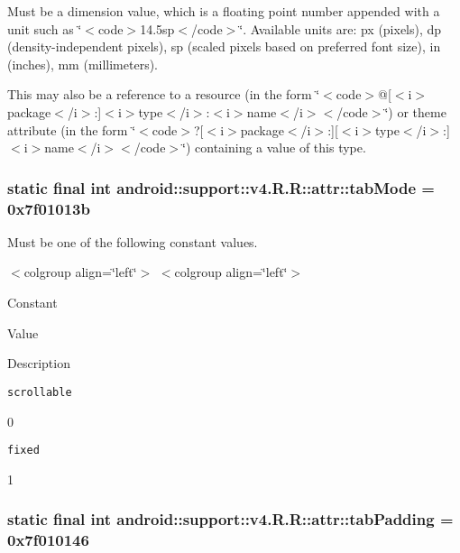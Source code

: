 Must be a dimension value, which is a floating point number appended with a unit such as \char`\"{}$<$code$>$14.5sp$<$/code$>$\char`\"{}. Available units are: px (pixels), dp (density-independent pixels), sp (scaled pixels based on preferred font size), in (inches), mm (millimeters). 

This may also be a reference to a resource (in the form \char`\"{}$<$code$>$@\mbox{[}$<$i$>$package$<$/i$>$:\mbox{]}$<$i$>$type$<$/i$>$:$<$i$>$name$<$/i$>$$<$/code$>$\char`\"{}) or theme attribute (in the form \char`\"{}$<$code$>$?\mbox{[}$<$i$>$package$<$/i$>$:\mbox{]}\mbox{[}$<$i$>$type$<$/i$>$:\mbox{]}$<$i$>$name$<$/i$>$$<$/code$>$\char`\"{}) containing a value of this type. \hypertarget{classandroid_1_1support_1_1v4_1_1_r_1_1attr_fdc60806c7b1b6fec8cb86d425dd3125}{
\subsubsection[{tabMode}]{\setlength{\rightskip}{0pt plus 5cm}static final int android::support::v4.R.R::attr::tabMode = 0x7f01013b}}
\label{classandroid_1_1support_1_1v4_1_1_r_1_1attr_fdc60806c7b1b6fec8cb86d425dd3125}


Must be one of the following constant values. \begin{TabularC}{0}
\hline
\end{TabularC}
$<$colgroup align=\char`\"{}left\char`\"{}$>$ $<$colgroup align=\char`\"{}left\char`\"{}$>$ 

Constant

Value

Description 

{\tt scrollable}

0

{\tt fixed}

1\hypertarget{classandroid_1_1support_1_1v4_1_1_r_1_1attr_86d1c72c198fed5b36bcaf128024eba6}{
\subsubsection[{tabPadding}]{\setlength{\rightskip}{0pt plus 5cm}static final int android::support::v4.R.R::attr::tabPadding = 0x7f010146}}
\label{classandroid_1_1support_1_1v4_1_1_r_1_1attr_86d1c72c198fed5b36bcaf128024eba6}


